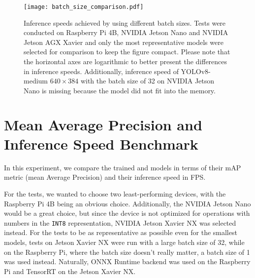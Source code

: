 
\begin{figure}[t]
    \begin{framed}
        \centering
        \texttt{[image: batch\_size\_comparison.pdf]}
        \caption{Inference speeds achieved by using different batch sizes. Tests
        were conducted on Raspberry Pi 4B, NVIDIA Jetson Nano and NVIDIA Jetson
        AGX Xavier and only the most representative models were selected for
        comparison to keep the figure compact. Please note that the horizontal
        axes are logarithmic to better present the differences in inference
        speeds. Additionally, inference speed of YOLOv8-medium $640 \times 384$
        with the batch size of 32 on NVIDIA Jetson Nano is missing because the
        model did not fit into the memory.}
        \label{BatchSizeComparison}
    \end{framed}
\end{figure}





\section{Mean Average Precision and Inference Speed Benchmark}
\label{FPSvsmAPComparison}

In this experiment, we compare the trained and models in terms of their mAP
metric (mean Average Precision) and their inference speed in FPS.

For the tests, we wanted to choose two least-performing devices, with the
Raspberry Pi 4B being an obvious choice. Additionally, the NVIDIA Jetson Nano
would be a great choice, but since the device is not optimized for operations
with numbers in the \texttt{INT8} representation, NVIDIA Jetson Xavier NX was
selected instead. For the tests to be as representative as possible even for the
smallest models, tests on Jetson Xavier NX were run with a large batch size of
32, while on the Raspberry Pi, where the batch size doesn't really matter, a
batch size of 1 was used instead. Naturally, ONNX Runtime backend was used on
the Raspberry Pi and TensorRT on the Jetson Xavier NX.

